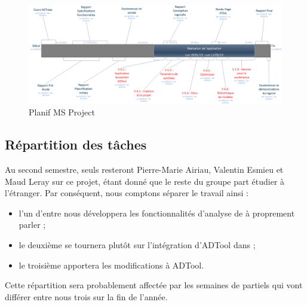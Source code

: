 		\begin{landscape}
			\begin{figure}
				\centering
				\includegraphics[height=0.50\textwidth]{figure/planification.png}
				\caption{Planif MS Project}
				\label{fig:planif}
			\end{figure}
		\end{landscape}


	\subsection{Répartition des tâches}
		Au second semestre, seuls resteront Pierre-Marie {\sc Airiau}, Valentin {\sc Esmieu} et Maud {\sc Leray} sur ce projet, étant donné que le reste du groupe part étudier à l'étranger. Par conséquent, nous comptons séparer le travail ainsi :
		\begin{itemize} %
			\item l'un d'entre nous développera les fonctionnalités d'analyse de \glasir{} à proprement parler ;
			\item le deuxième se tournera plutôt sur l'intégration d'ADTool dans \glasir{} ;
			\item le troisième apportera les modifications à ADTool.
		\end{itemize}
		Cette répartition sera probablement affectée par les semaines de partiels qui vont différer entre nous trois sur la fin de l'année.
